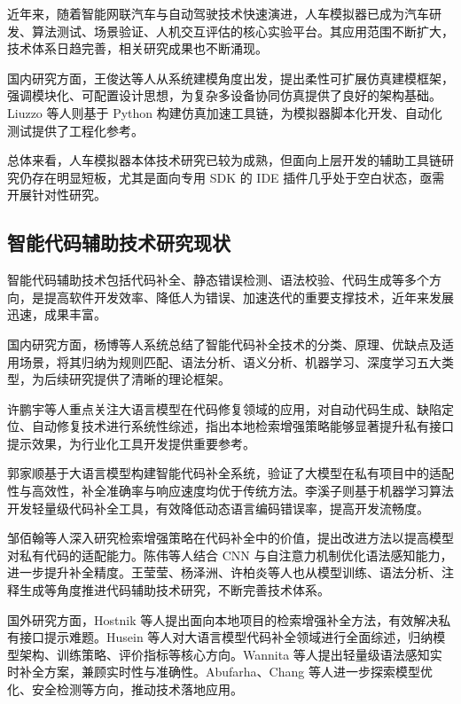 近年来，随着智能网联汽车与自动驾驶技术快速演进，人车模拟器已成为汽车研发、算法测试、场景验证、人机交互评估的核心实验平台。其应用范围不断扩大，技术体系日趋完善，相关研究成果也不断涌现。

国内研究方面，王俊达等人从系统建模角度出发，提出柔性可扩展仿真建模框架，强调模块化、可配置设计思想，为复杂多设备协同仿真提供了良好的架构基础\cite{ref3}。Liuzzo
等人则基于 Python
构建仿真加速工具链，为模拟器脚本化开发、自动化测试提供了工程化参考\cite{ref4}。

总体来看，人车模拟器本体技术研究已较为成熟，但面向上层开发的辅助工具链研究仍存在明显短板，尤其是面向专用
SDK 的 IDE 插件几乎处于空白状态，亟需开展针对性研究。

\subsection{智能代码辅助技术研究现状}

智能代码辅助技术包括代码补全、静态错误检测、语法校验、代码生成等多个方向，是提高软件开发效率、降低人为错误、加速迭代的重要支撑技术，近年来发展迅速，成果丰富。

国内研究方面，杨博等人系统总结了智能代码补全技术的分类、原理、优缺点及适用场景，将其归纳为规则匹配、语法分析、语义分析、机器学习、深度学习五大类型，为后续研究提供了清晰的理论框架\cite{ref5}。

许鹏宇等人重点关注大语言模型在代码修复领域的应用，对自动代码生成、缺陷定位、自动修复技术进行系统性综述，指出本地检索增强策略能够显著提升私有接口提示效果，为行业化工具开发提供重要参考\cite{ref6}。

郭家顺基于大语言模型构建智能代码补全系统，验证了大模型在私有项目中的适配性与高效性，补全准确率与响应速度均优于传统方法\cite{ref7}。李溪子则基于机器学习算法开发轻量级代码补全工具，有效降低动态语言编码错误率，提高开发流畅度\cite{ref8}。

邹佰翰等人深入研究检索增强策略在代码补全中的价值，提出改进方法以提高模型对私有代码的适配能力\cite{ref9}。陈伟等人结合
CNN
与自注意力机制优化语法感知能力，进一步提升补全精度\cite{ref10}。王莹莹、杨泽洲、许柏炎等人也从模型训练、语法分析、注释生成等角度推进代码辅助技术研究，不断完善技术体系\cite{ref11,ref12,ref13}。

国外研究方面，Hostnik
等人提出面向本地项目的检索增强补全方法，有效解决私有接口提示难题\cite{ref14}。Husein
等人对大语言模型代码补全领域进行全面综述，归纳模型架构、训练策略、评价指标等核心方向\cite{ref15}。Wannita
等人提出轻量级语法感知实时补全方案，兼顾实时性与准确性\cite{ref16}。Abufarha、Chang
等人进一步探索模型优化、安全检测等方向，推动技术落地应用\cite{ref17,ref18}。

